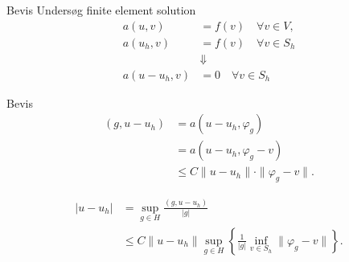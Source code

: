 \begin{frame}{Bevis}
    Undersøg finite element solution
    \begin{align*}
        a(u,v) &= f(v) \quad \forall v \in V, \\
        a(u_h,v) &= f(v) \quad \forall v \in S_h\\
        &\Downarrow \\ 
        a(u-u_h,v) &= 0 \quad \forall v \in S_h
    \end{align*}
\end{frame}
\begin{frame}{Bevis}
    \begin{align*}
        (g,u-u_h) &= a(u-u_h,\varphi _g) \\
                  &=a(u-u_h, \varphi_g -v) \\
                  &\leq C \|u-u_h\| \cdot \|\varphi_g-v\|.
    \end{align*}

    \begin{align*}
        |u-u_h| &= \sup_{g\in H} \frac{(g,u-u_h)}{|g|} \\
        &\leq C \| u-u_h\| \sup_{g\in H} \left \{ \frac{1}{|g|} \inf_{v \in S_h} \|\varphi_g - v\| \right \}.
    \end{align*}
\end{frame}

